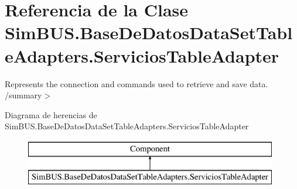 \section{Referencia de la Clase Sim\-B\-U\-S.\-Base\-De\-Datos\-Data\-Set\-Table\-Adapters.\-Servicios\-Table\-Adapter}
\label{class_sim_b_u_s_1_1_base_de_datos_data_set_table_adapters_1_1_servicios_table_adapter}


Represents the connection and commands used to retrieve and save data. /summary$>$  


Diagrama de herencias de Sim\-B\-U\-S.\-Base\-De\-Datos\-Data\-Set\-Table\-Adapters.\-Servicios\-Table\-Adapter\begin{figure}[H]
\begin{center}
\leavevmode
\includegraphics[height=2.000000cm]{class_sim_b_u_s_1_1_base_de_datos_data_set_table_adapters_1_1_servicios_table_adapter}
\end{center}
\end{figure}
